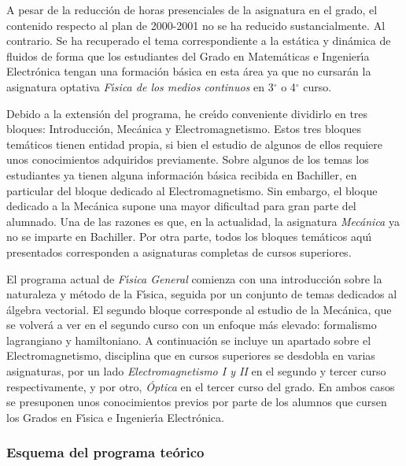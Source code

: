 A pesar de la reducci\'{o}n de horas presenciales de la asignatura en el grado, 
el contenido respecto al plan de 2000-2001 no se ha reducido sustancialmente. 
Al contrario. Se ha recuperado el tema correspondiente a la est\'{a}tica 
y din\'{a}mica de fluidos de forma que los estudiantes del Grado en Matem\'{a}ticas
 e Ingenier\'{\i}a Electr\'{o}nica tengan una formaci\'{o}n b\'{a}sica en esta \'{a}rea
ya que no cursar\'{a}n la asignatura optativa {\it F\'{\i}sica de los medios continuos} en 3{$^\circ$} o 4{$^\circ$} curso.


 Debido a la extensi\'{o}n del programa, he cre\'{\i}do conveniente 
dividirlo en  tres bloques: Introducci\'{o}n,
 Mec\'{a}nica y Electromagnetismo. Estos  tres
 bloques tem\'{a}ticos tienen entidad propia, si bien el estudio de 
algunos de ellos requiere unos conocimientos adquiridos 
previamente.
 Sobre algunos de los temas los estudiantes  ya 
tienen alguna informaci\'{o}n b\'{a}sica recibida en Bachiller,
 en particular del bloque dedicado al Electromagnetismo. 
Sin embargo, el bloque dedicado a la Mec\'{a}nica 
supone una  mayor dificultad  para gran
 parte del alumnado. Una de las razones es que, en la actualidad,
la asignatura {\it Mec\'{a}nica} ya no se imparte  en Bachiller.
Por otra parte, todos los bloques tem\'{a}ticos aqu\'{\i} 
presentados corresponden a asignaturas completas de cursos superiores.


El programa actual de  {\it  F\'{\i}sica General}
comienza con una introducci\'{o}n sobre la naturaleza 
y m\'{e}todo de la F\'{\i}sica, seguida por un conjunto de temas dedicados
 al \'{a}lgebra vectorial. El segundo bloque  corresponde al estudio 
de la Mec\'{a}nica, que 
se volver\'{a} a ver en el  segundo curso
con un enfoque  m\'{a}s elevado: formalismo lagrangiano y hamiltoniano. 
A continuaci\'{o}n se incluye un apartado sobre el Electromagnetismo, 
disciplina que en cursos superiores se desdobla en varias asignaturas, 
por un lado {\it Electromagnetismo I y II} en el segundo y tercer curso 
respectivamente, y por otro, {\it \'{O}ptica}
 en el tercer curso del grado.
 En ambos casos se presuponen unos conocimientos previos por parte 
de los alumnos que cursen los Grados en F\'{\i}sica e Ingenier\'{\i}a Electr\'{o}nica. 

\newpage
\subsubsection{\large Esquema del programa te\'{o}rico}
\label{esquema-bolonia}


